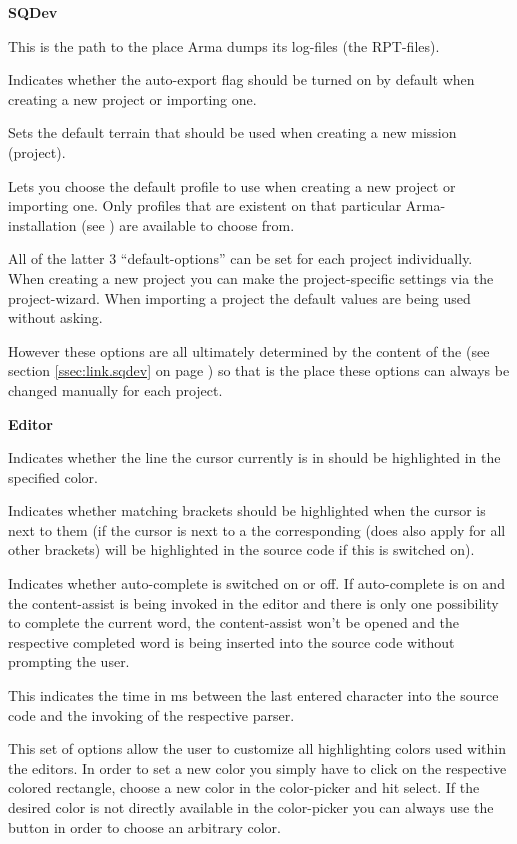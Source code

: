 \documentclass[twoside=false]{scrbook}
\newcommand{\SQDev}{SQDev\xspace}
\newcommand{\arma}{Arma\xspace}
\newenvironment{options*}{%
	\vspace{3mm}%
	\hrule{}

	\newcommand{\option}[1]{%
		\item \textbf{##1} - \hspace{-1.6mm}%
	}%
	\begin{itemize}%
}{%
	\end{itemize}\hrule%
	\vspace{3mm}%
}
\newenvironment{options}[1][Options]{%
	\needspace{2\baselineskip}
	\textbf{#1}%
	\begin{options*}%
}{%
	\end{options*}%
}
\begin{document}
\begin{options}[\SQDev]
		 This is the path to the place \arma dumps its log-files (the RPT-files).
		
		 Indicates whether the auto-export flag should be turned on by default when creating a new project or importing one.
		
		 Sets the default terrain that should be used when creating a new mission (project).
		
		 Lets you choose the default profile to use when creating a new project or importing one. Only profiles that are existent on that particular \arma-installation (see ) are available to choose from.
	\end{options}
	
	All of the latter 3 “default-options” can be set for each project individually. When creating a new project you can make the project-specific settings via the project-wizard. When importing a project the default values are being used without asking.
	
	However these options are all ultimately determined by the content of the  (see section \ref{ssec:link.sqdev} on page \pageref{ssec:link.sqdev}) so that is the place these options can always be changed manually for each project.
	
	\vspace{1.5cm}
	
	\begin{options}[Editor]
		 Indicates whether the line the cursor currently is in should be highlighted in the specified color.
		
		 Indicates whether matching brackets should be highlighted when the cursor is next to them (if the cursor is next to a \keys{(} the corresponding \keys{)} (does also apply for all other brackets) will be highlighted in the source code if this is switched on).
		
		 Indicates whether auto-complete is switched on or off. If auto-complete is on and the content-assist is being invoked in the editor and there is only one possibility to complete the current word, the content-assist won't be opened and the respective completed word is being inserted into the source code without prompting the user.
		
		 This indicates the time in ms between the last entered character into the source code and the invoking of the respective parser.
		
		 This set of options allow the user to customize all highlighting colors used within the editors. In order to set a new color you simply have to click on the respective colored rectangle, choose a new color in the color-picker and hit select. If the desired color is not directly available in the color-picker you can always use the \keys[,]{+} button in order to choose an arbitrary color.
	\end{options}
	
\end{document}
